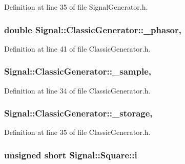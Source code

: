 Definition at line 35 of file Signal\+Generator.\+h.

\hypertarget{classSignal_1_1ClassicGenerator_ade9b66bc49d2d2f40a1390fc6374b8b2}{
\subsubsection[{\+\_\+phasor}]{\setlength{\rightskip}{0pt plus 5cm}double Signal\+::\+Classic\+Generator\+::\+\_\+phasor\hspace{0.3cm}{\ttfamily [protected]}, {\ttfamily [inherited]}}}\label{classSignal_1_1ClassicGenerator_ade9b66bc49d2d2f40a1390fc6374b8b2}


Definition at line 41 of file Classic\+Generator.\+h.

\hypertarget{classSignal_1_1ClassicGenerator_a40313d0d806d6e44af7d41b3ef3a0822}{
\subsubsection[{\+\_\+sample}]{ Signal\+::\+Classic\+Generator\+::\+\_\+sample\hspace{0.3cm}{\ttfamily [protected]}, {\ttfamily [inherited]}}}\label{classSignal_1_1ClassicGenerator_a40313d0d806d6e44af7d41b3ef3a0822}


Definition at line 34 of file Classic\+Generator.\+h.

\hypertarget{classSignal_1_1ClassicGenerator_a1214faf589eccb01631700723900bbf9}{
\subsubsection[{\+\_\+storage}]{ Signal\+::\+Classic\+Generator\+::\+\_\+storage\hspace{0.3cm}{\ttfamily [protected]}, {\ttfamily [inherited]}}}\label{classSignal_1_1ClassicGenerator_a1214faf589eccb01631700723900bbf9}


Definition at line 35 of file Classic\+Generator.\+h.

\hypertarget{classSignal_1_1Square_a3170f60bd41cbd43c861a63e0a5ae31d}{
\subsubsection[{i}]{\setlength{\rightskip}{0pt plus 5cm}unsigned short Signal\+::\+Square\+::i\hspace{0.3cm}{\ttfamily [protected]}}}\label{classSignal_1_1Square_a3170f60bd41cbd43c861a63e0a5ae31d}


